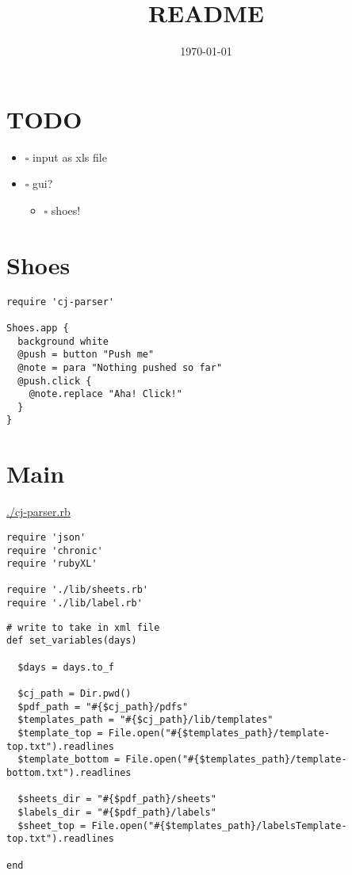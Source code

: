 \documentclass[11pt]{article}
\date{\today}
\title{README}
\begin{document}
\maketitle
\tableofcontents

\section{{\bfseries\sffamily TODO} }
\label{sec-1}

\begin{itemize}
\item $\square$ input as xls file
\item $\square$ gui?
\begin{itemize}
\item $\square$ shoes!
\end{itemize}
\end{itemize}

\section{Shoes}
\label{sec-2}

\begin{verbatim}
require 'cj-parser'

Shoes.app {
  background white
  @push = button "Push me"
  @note = para "Nothing pushed so far"
  @push.click {
    @note.replace "Aha! Click!"
  }
}
\end{verbatim}

\section{Main}
\label{sec-3}

\url{./cj-parser.rb}

\begin{verbatim}
require 'json'
require 'chronic'
require 'rubyXL'

require './lib/sheets.rb'
require './lib/label.rb'
\end{verbatim}

\begin{verbatim}
# write to take in xml file
def set_variables(days)

  $days = days.to_f

  $cj_path = Dir.pwd()
  $pdf_path = "#{$cj_path}/pdfs"
  $templates_path = "#{$cj_path}/lib/templates"
  $template_top = File.open("#{$templates_path}/template-top.txt").readlines
  $template_bottom = File.open("#{$templates_path}/template-bottom.txt").readlines

  $sheets_dir = "#{$pdf_path}/sheets"
  $labels_dir = "#{$pdf_path}/labels"
  $sheet_top = File.open("#{$templates_path}/labelsTemplate-top.txt").readlines

end
\end{verbatim}
\end{document}
